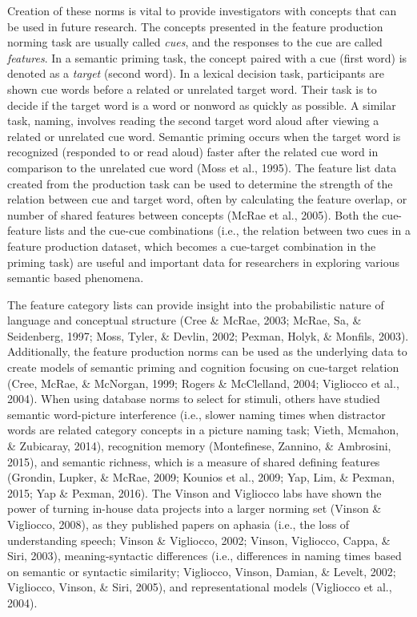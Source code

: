 \documentclass[english,,man]{apa6}
\theoremstyle{definition}
\theoremstyle{definition}
\theoremstyle{definition}
\theoremstyle{remark}
\begin{document}
Creation of these norms is vital to provide investigators with concepts
that can be used in future research. The concepts presented in the
feature production norming task are usually called \emph{cues}, and the
responses to the cue are called \emph{features}. In a semantic priming
task, the concept paired with a cue (first word) is denoted as a
\emph{target} (second word). In a lexical decision task, participants
are shown cue words before a related or unrelated target word. Their
task is to decide if the target word is a word or nonword as quickly as
possible. A similar task, naming, involves reading the second target
word aloud after viewing a related or unrelated cue word. Semantic
priming occurs when the target word is recognized (responded to or read
aloud) faster after the related cue word in comparison to the unrelated
cue word (Moss et al., 1995). The feature list data created from the
production task can be used to determine the strength of the relation
between cue and target word, often by calculating the feature overlap,
or number of shared features between concepts (McRae et al., 2005). Both
the cue-feature lists and the cue-cue combinations (i.e., the relation
between two cues in a feature production dataset, which becomes a
cue-target combination in the priming task) are useful and important
data for researchers in exploring various semantic based phenomena.

The feature category lists can provide insight into the probabilistic
nature of language and conceptual structure (Cree \& McRae, 2003; McRae,
Sa, \& Seidenberg, 1997; Moss, Tyler, \& Devlin, 2002; Pexman, Holyk, \&
Monfils, 2003). Additionally, the feature production norms can be used
as the underlying data to create models of semantic priming and
cognition focusing on cue-target relation (Cree, McRae, \& McNorgan,
1999; Rogers \& McClelland, 2004; Vigliocco et al., 2004). When using
database norms to select for stimuli, others have studied semantic
word-picture interference (i.e., slower naming times when distractor
words are related category concepts in a picture naming task; Vieth,
Mcmahon, \& Zubicaray, 2014), recognition memory (Montefinese, Zannino,
\& Ambrosini, 2015), and semantic richness, which is a measure of shared
defining features (Grondin, Lupker, \& McRae, 2009; Kounios et al.,
2009; Yap, Lim, \& Pexman, 2015; Yap \& Pexman, 2016). The Vinson and
Vigliocco labs have shown the power of turning in-house data projects
into a larger norming set (Vinson \& Vigliocco, 2008), as they published
papers on aphasia (i.e., the loss of understanding speech; Vinson \&
Vigliocco, 2002; Vinson, Vigliocco, Cappa, \& Siri, 2003),
meaning-syntactic differences (i.e., differences in naming times based
on semantic or syntactic similarity; Vigliocco, Vinson, Damian, \&
Levelt, 2002; Vigliocco, Vinson, \& Siri, 2005), and representational
models (Vigliocco et al., 2004).
\end{document}
